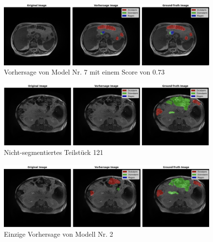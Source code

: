\begin{figure}[H]
	\begin{center}
		\includegraphics[width=400pt]{LaTex/bilder/case18_day19_slice_0079.png}
		\caption{ Vorhersage von Model Nr. 7 mit einem Score von 0.73 }\label{Fig:case18_day19_slice_0079}
	\end{center}
\end{figure}

\begin{figure}[H]
	\begin{center}
		\includegraphics[width=400pt]{LaTex/bilder/case88_day0_slice_0121.png}
		\caption{ Nicht-segmentiertes Teilstück 121 }\label{Fig:case88_day0_slice_0121}
	\end{center}
\end{figure}

\begin{figure}[H]
	\begin{center}
		\includegraphics[width=400pt]{LaTex/bilder/case88_day0_slice_0120_no2.png}
		\caption{ Einzige Vorhersage von Modell Nr. 2 }\label{Fig:case88_day0_slice_0120}
	\end{center}
\end{figure}

